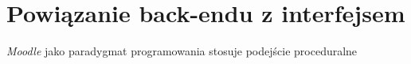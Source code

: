 \section{Powiązanie back-endu z interfejsem}
\label{Chapter67}

\emph{Moodle} jako paradygmat programowania stosuje podejście proceduralne 